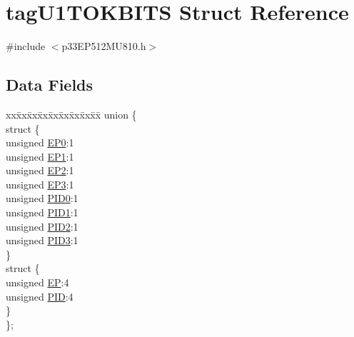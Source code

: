 \hypertarget{structtag_u1_t_o_k_b_i_t_s}{}\section{tag\+U1\+T\+O\+K\+B\+I\+TS Struct Reference}
\label{structtag_u1_t_o_k_b_i_t_s}


{\ttfamily \#include $<$p33\+E\+P512\+M\+U810.\+h$>$}

\subsection*{Data Fields}
\begin{DoxyCompactItemize}
\item 
\begin{tabbing}
xx\=xx\=xx\=xx\=xx\=xx\=xx\=xx\=xx\=\kill
union \{\\
\>struct \{\\
\>\>unsigned \hyperlink{structtag_u1_t_o_k_b_i_t_s_a47888cc81be5b63d05f671d1071734ee}{EP0}:1\\
\>\>unsigned \hyperlink{structtag_u1_t_o_k_b_i_t_s_afb4fc91902c76f53413a7a53c7c3d4ab}{EP1}:1\\
\>\>unsigned \hyperlink{structtag_u1_t_o_k_b_i_t_s_a6aaf00c6a806aa275c4bc3a3f8dd8a08}{EP2}:1\\
\>\>unsigned \hyperlink{structtag_u1_t_o_k_b_i_t_s_afbf7ddcbae051cc046e7f4583bdd366c}{EP3}:1\\
\>\>unsigned \hyperlink{structtag_u1_t_o_k_b_i_t_s_a810a2f6d15fc42c5d1e610b6e927d2eb}{PID0}:1\\
\>\>unsigned \hyperlink{structtag_u1_t_o_k_b_i_t_s_acefd8c6eba334031c18cd877dfe08bfb}{PID1}:1\\
\>\>unsigned \hyperlink{structtag_u1_t_o_k_b_i_t_s_aef3d6a9445a3c61d870212360c0a6110}{PID2}:1\\
\>\>unsigned \hyperlink{structtag_u1_t_o_k_b_i_t_s_a771971768126aebea428ac7194b17fc0}{PID3}:1\\
\>\} \\
\>struct \{\\
\>\>unsigned \hyperlink{structtag_u1_t_o_k_b_i_t_s_ab50f09376341fd9f645d9870b25767e9}{EP}:4\\
\>\>unsigned \hyperlink{structtag_u1_t_o_k_b_i_t_s_a97b41b25e06fd7857dcc6217c160a8ad}{PID}:4\\
\>\} \\
\}; \\

\end{tabbing}\end{DoxyCompactItemize}



